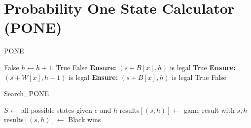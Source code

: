 \section{Probability One State Calculator (PONE)}

\begin{algorithm}
    \caption{PONE}\label{pone}
    \begin{algorithmic}[1]
             \Return False
            \Else \State $h \gets h+1$.
            \EndIf
        \EndIf
            \Return True
            \Return False
        \Else
                    \State \textbf{Ensure:} $(s + B[x], h)$ is legal
                     \Return True \EndIf
                \EndFor
                    \State \textbf{Ensure:} $(s + W[x], h-1)$ is legal
                    \State \textbf{Ensure:} $(s + B[x], h)$ is legal
                        \State \Return True
                    \EndIf
                \EndFor
            \EndIf
        \EndIf
        \State \Return False
    \EndFunction
    \end{algorithmic}
\end{algorithm}

\newpage
\begin{algorithm}
    \caption{Search_PONE}
    \label{s_pone}
    \begin{algorithmic}[1]
            \State $S \gets$ all possible states given $e$ and $h$
                    \State results$[(s, h)] \gets$ game result with $s, h$
                        \State results$[(s, h)] \gets$ Black wins
                    \EndIf
                \EndIf
            \EndFor
        \EndFor
    \EndFor
    \EndFunction
    \end{algorithmic}
\end{algorithm}


